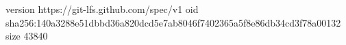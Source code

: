 version https://git-lfs.github.com/spec/v1
oid sha256:140a3288e51dbbd36a820dcd5e7ab8046f7402365a5f8e86db34cd3f78a00132
size 43840
